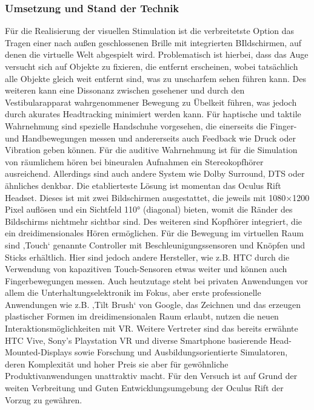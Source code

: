 \documentclass[12pt,a4paper,bibliography=totocnumbered,listof=totocnumbered]{scrartcl}
\begin{document}
\subsubsection{Umsetzung und Stand der Technik}
Für die Realisierung der visuellen Stimulation ist die verbreitetste Option das Tragen einer nach außen geschlossenen Brille mit integrierten BIldschirmen, auf denen die virtuelle Welt abgespielt wird. Problematisch ist hierbei, dass das Auge versucht sich auf Objekte zu fixieren, die entfernt erscheinen, wobei tatsächlich alle Objekte gleich weit entfernt sind, was zu unscharfem sehen führen kann. Des weiteren kann eine Dissonanz zwischen gesehener und durch den Vestibularapparat wahrgenommener Bewegung zu Übelkeit führen, was jedoch durch akurates Headtracking minimiert werden kann.
Für haptische und taktile Wahrnehmung sind spezielle Handschuhe vorgesehen, die einerseits die Finger- und Handbewegungen messen und andererseits auch Feedback wie Druck oder Vibration geben können. Für die auditive Wahrnehmung ist für die Simulation von räumlichem hören bei bineuralen Aufnahmen ein Stereokopfhörer ausreichend. Allerdings sind auch andere System wie Dolby Surround, DTS oder ähnliches denkbar.
Die etablierteste Lösung ist momentan das Oculus Rift Headset. Dieses ist mit zwei Bildschirmen ausgestattet, die jeweils mit 1080×1200 Pixel auflösen und ein Sichtfeld 110° (diagonal) bieten, womit die Ränder des Bildschirms nichtmehr sichtbar sind.
Des weiteren sind Kopfhörer integriert, die ein dreidimensionales Hören ermöglichen.
Für die Bewegung im virtuellen Raum sind ‚Touch‘ genannte Controller mit Beschleunigungssensoren und Knöpfen und Sticks erhältlich. Hier sind jedoch andere Hersteller, wie z.B. HTC durch die Verwendung von kapazitiven Touch-Sensoren etwas weiter und können auch Fingerbewegungen messen.
Auch heutzutage steht bei privaten Anwendungen vor allem die Unterhaltungselektronik im Fokus, aber erste professionelle Anwendungen wie z.B. ‚Tilt Brush‘ von Google, das Zeichnen und das erzeugen plastischer Formen im dreidimensionalen Raum erlaubt, nutzen die neuen Interaktionsmöglichkeiten mit VR.
Weitere Vertreter sind das bereits erwähnte HTC Vive, Sony’s Playstation VR und diverse Smartphone basierende Head-Mounted-Displays sowie Forschung und Ausbildungsorientierte Simulatoren, deren Komplexität und hoher Preis sie aber für gewöhnliche Produktivanwendungen unattraktiv macht.
Für den Versuch ist auf Grund der weiten Verbreitung und Guten Entwicklungsumgebung der Oculus Rift der Vorzug zu gewähren.
\end{document}
